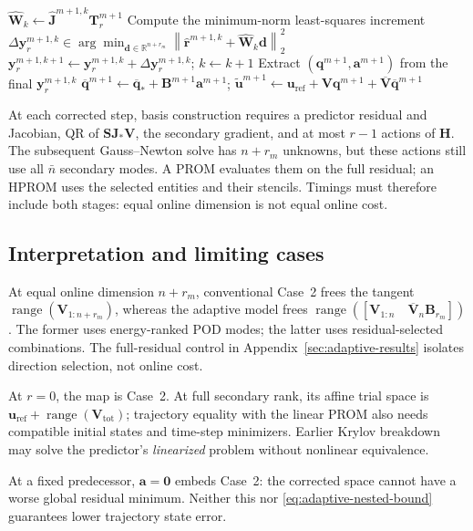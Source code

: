 \documentclass[11pt]{article}
\newcommand{\q}{\mathbf q}
\newcommand{\qbar}{\overline{\mathbf q}}
\newcommand{\uvec}{\mathbf u}
\newcommand{\utilde}{\widetilde{\mathbf u}}
\newcommand{\norm}[1]{\left\lVert #1 \right\rVert}
\begin{document}
\begin{algorithm}[H]
\begin{algorithmic}[1]
    \State $\widehat{\mathbf W}_k\gets
    \widehat{\mathbf J}^{m+1,k}\mathbf T_r^{m+1}$
    \State Compute the minimum-norm least-squares increment
    \Statex \hspace{\algorithmicindent}$\displaystyle
    \Delta\mathbf y_r^{m+1,k}\in
    \arg\min_{\mathbf d\in\mathbb R^{n+r_m}}
    \norm{\widehat{\mathbf r}^{m+1,k}
    +\widehat{\mathbf W}_k\mathbf d}_2^2$
    \State $\mathbf y_r^{m+1,k+1}\gets
    \mathbf y_r^{m+1,k}+\Delta\mathbf y_r^{m+1,k}$;
    $k\gets k+1$
  \EndWhile
  \State Extract $(\q^{m+1},\mathbf a^{m+1})$ from the final
  $\mathbf y_r^{m+1,k}$
  \State $\qbar^{m+1}\gets\qbar_*+\mathbf B^{m+1}\mathbf a^{m+1}$;
  $\utilde^{m+1}\gets\uvec_{\mathrm{ref}}+
  \mathbf V\q^{m+1}+\overline{\mathbf V}\qbar^{m+1}$
\EndFor
\end{algorithmic}
\end{algorithm}

At each corrected step, basis construction requires a predictor residual
and Jacobian, QR of $\mathbf S\mathbf J_*\mathbf V$, the secondary
gradient, and at most $r-1$ actions of $\mathbf H$.  The subsequent
Gauss--Newton solve has $n+r_m$ unknowns, but these actions still use all
$\bar n$ secondary modes.  A PROM evaluates them on the full residual;
an HPROM uses the selected entities and their stencils.  Timings must therefore
include both stages: equal online dimension is not equal online cost.

\subsection{Interpretation and limiting cases}
At equal online dimension $n+r_m$, conventional Case~2 frees the tangent
$\operatorname{range}(\mathbf V_{1:n+r_m})$, whereas the adaptive model
frees $\operatorname{range}([\mathbf V_{1:n}\quad
\overline{\mathbf V}_{n}\mathbf B_{r_m}])$.  The former uses energy-ranked
POD modes; the latter uses residual-selected combinations.  The
full-residual control in Appendix~\ref{sec:adaptive-results} isolates
direction selection, not online cost.

At $r=0$, the map is Case~2.  At full secondary rank, its affine trial
space is $\uvec_{\mathrm{ref}}+\operatorname{range}(\mathbf V_{\mathrm{tot}})$;
trajectory equality with the linear PROM also needs compatible initial
states and time-step minimizers.  Earlier Krylov breakdown may solve the
predictor's \emph{linearized} problem without nonlinear equivalence.

At a fixed predecessor, $\mathbf a=\mathbf0$ embeds Case~2: the corrected
space cannot have a worse global residual minimum.  Neither this nor
\eqref{eq:adaptive-nested-bound} guarantees lower trajectory state error.
\end{document}
